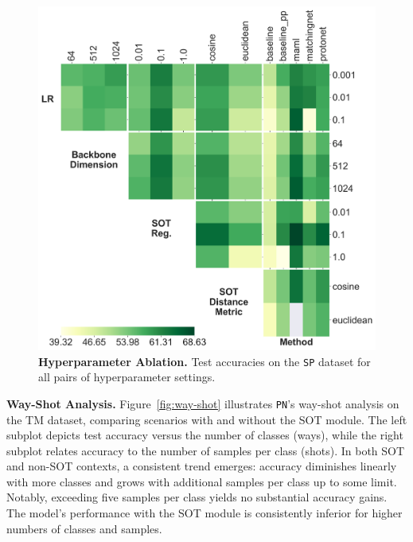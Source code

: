 \begin{figure}[h!]
    \centering
    \includegraphics[width=1\columnwidth]{figures/hparams-interaction.png}
    \caption{\textbf{Hyperparameter Ablation.} Test accuracies on the \texttt{SP} dataset for all pairs of hyperparameter settings.}
    \label{fig:hparams-swissprot-grid}
\end{figure}



\textbf{Way-Shot Analysis.} Figure~\ref{fig:way-shot} illustrates \texttt{PN}'s way-shot analysis on the TM dataset, comparing scenarios with and without the SOT module. The left subplot depicts test accuracy versus the number of classes (ways), while the right subplot relates accuracy to the number of samples per class (shots). In both SOT and non-SOT contexts, a consistent trend emerges: accuracy diminishes linearly with more classes and grows with additional samples per class up to some limit. Notably, exceeding five samples per class yields no substantial accuracy gains. The model's performance with the SOT module is consistently inferior for higher numbers of classes and samples.

